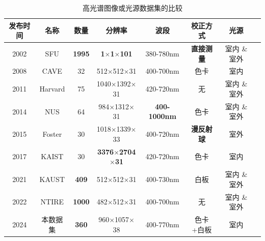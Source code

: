 \documentclass[
    type = master, %
    degree = academic,        %
    decl-page,  %
  ]{njuthesis}
\begin{document}
\begin{table}[h]
\centering
\caption{高光谱图像或光源数据集的比较}
\label{tab: illumination datasets}
\begin{tabular}{cccc cccc}
\hline
发布时间 & 名称 & 数量 & 分辨率 & 波段  & 校正方式 & 光源       \\
\hline
2002 &  SFU\cite{barnard2002data}%
& \textbf{1995}     & \textbf{1$\times$1$\times$101}      & 380-780nm              &  \textbf{直接测量}    & 室内 \& 室外 \\
2008 & CAVE\cite{yasuma2010generalized}%
& 32       & 512$\times$512$\times$31            & 400-700nm              &  色卡    & 室内             \\
2011 & Harvard\cite{chakrabarti2011statistics}%
& 75       & 1040$\times$1392$\times$31          & 420-720nm             &  无      & 室内 \& 室外 \\
2014 & NUS\cite{nguyen2014training}
&64 & 984$\times$1312$\times$31 & \textbf{400-1000nm}    &  色卡    & 室内 \& 室外     \\    
2015 & Foster\cite{nascimento2016spatial}%
& 30       & 1018$\times$1339$\times$33          & 400-720nm              & \textbf{漫反射球}     & 室外           \\
2017 & KAIST\cite{choi2017high}%
& 30       & \textbf{3376$\times$2704$\times$31}          & 420-720nm              & 色卡     & 室内           \\
2021 & KAUST\cite{li2021multispectral}%
&  \textbf{409}      & 512$\times$512$\times$31            & 400-730nm              &  白板    & 室内 \& 室外 \\
2022 & NTIRE\cite{arad2022ntire}%
& \textbf{1000}     & 482$\times$512$\times$31            & 400-700nm               &  无    & 室内 \& 室外 \\
2024 &  本数据集 & \textbf{360}      & 960$\times$1057$\times$38 & 400-770nm    &  色卡+白板    & 室内     \\       
\hline
\end{tabular}
\end{table}
\end{document}
